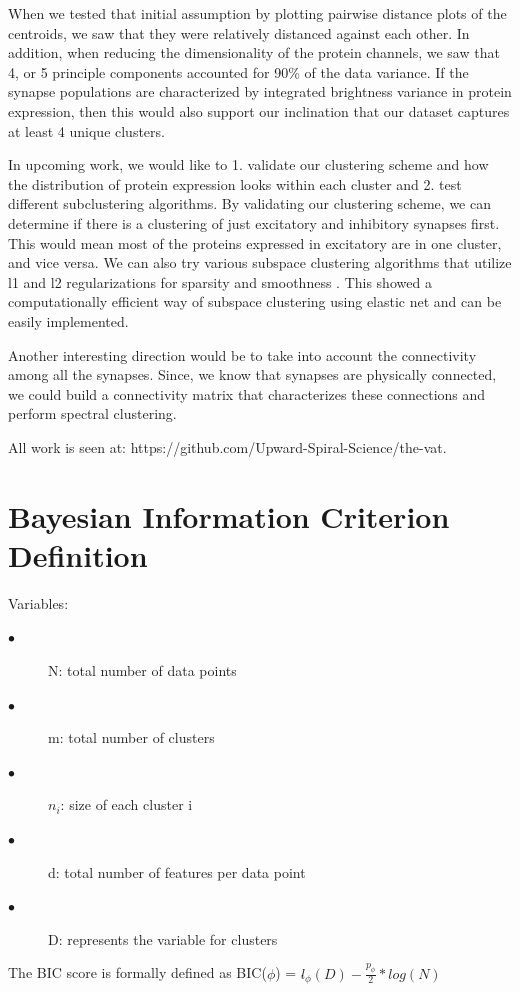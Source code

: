 \documentclass{article}
\begin{document}
When we tested that initial assumption by plotting pairwise distance plots of the centroids, we saw that they were relatively distanced against each other. In addition, when reducing the dimensionality of the protein channels, we saw that 4, or 5 principle components accounted for 90\% of the data variance. If the synapse populations are characterized by integrated brightness variance in protein expression, then this would also support our inclination that our dataset captures at least 4 unique clusters. 

In upcoming work, we would like to 1. validate our clustering scheme and how the distribution of protein expression looks within each cluster and 2. test different subclustering algorithms. By validating our clustering scheme, we can determine if there is a clustering of just excitatory and inhibitory synapses first. This would mean most of the proteins expressed in excitatory are in one cluster, and vice versa. We can also try various subspace clustering algorithms that utilize l1 and l2 regularizations for sparsity and smoothness \cite{You}. This showed a computationally efficient way of subspace clustering using elastic net and can be easily implemented.

Another interesting direction would be to take into account the connectivity among all the synapses. Since, we know that synapses are physically connected, we could build a connectivity matrix that characterizes these connections and perform spectral clustering.

All work is seen at: https://github.com/Upward-Spiral-Science/the-vat.
\appendix

\section{Bayesian Information Criterion Definition}
Variables:
\begin{description}
\item[$\bullet$] N: total number of data points
\item[$\bullet$] m: total number of clusters
\item[$\bullet$] $n_i$: size of each cluster i
\item[$\bullet$] d: total number of features per data point
\item[$\bullet$] D: represents the variable for clusters
\end{description}

The BIC score is formally defined as 
BIC($\phi$) = $l\widehat{}_{\phi}(D) - \frac{p_{\phi}}{2}*log(N)$
\end{document}
